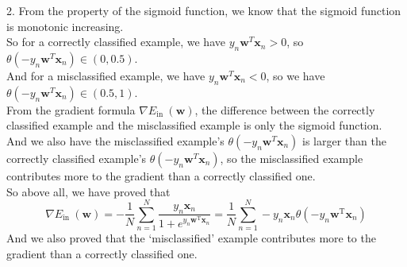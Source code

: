 2. From the property of the sigmoid function, we know that the sigmoid function is monotonic increasing.\\
So for a correctly classified example, we have $y_n\mathbf{w}^T\mathbf{x}_n>0$, so $\theta(-y_n\mathbf{w}^T\mathbf{x}_n)\in (0,0.5)$.\\

And for a misclassified example, we have $y_n\mathbf{w}^T\mathbf{x}_n<0$, so we have $\theta(-y_n\mathbf{w}^T\mathbf{x}_n)\in (0.5,1)$.\\

From the gradient formula $\nabla  E_{\text {in }}(\mathbf{w})$, the difference between the correctly classified example and the misclassified example is only the sigmoid function.\\
And we also have the misclassified example's $\theta(-y_n\mathbf{w}^T\mathbf{x}_n)$ is larger than the correctly classified example's $\theta(-y_n\mathbf{w}^T\mathbf{x}_n)$, so the misclassified example contributes more to the gradient than a correctly classified one.\\

So above all, we have proved that
$$\nabla E_{\text {in }}(\mathbf{w})  =-\frac{1}{N} \sum_{n=1}^{N} \frac{y_{n} \mathbf{x}_{n}}{1+e^{y_{n} \mathbf{w}^{\mathrm{T}} \mathbf{x}_{n}}}=\frac{1}{N} \sum_{n=1}^{N}-y_{n} \mathbf{x}_{n} \theta\left(-y_{n} \mathbf{w}^{\mathrm{T}} \mathbf{x}_{n}\right)$$
And we also proved that the `misclassified' example contributes more to the gradient than a correctly classified one.\\

\newpage